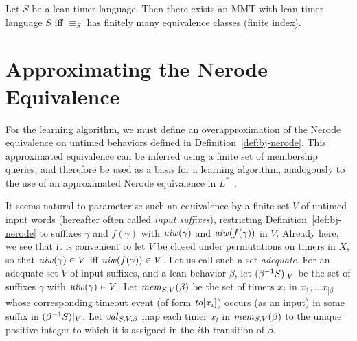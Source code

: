 \begin{theorem}
  \label{thm:bj-nerode}
Let $S$ be a lean timer language.
Then there exists an MMT with lean timer language $S$ iff 
$\equiv_S$ has finitely many equivalence classes (finite index).
\end{theorem}

\section{Approximating the Nerode Equivalence}
\label{sec:approx}

For the learning algorithm, we must define an overapproximation
of the Nerode equivalence on untimed behaviors
defined in Definition~\ref{def:bj-nerode}. This
approximated equivalence can be inferred using a finite set of membership
queries, and therefore be used as a basis for a learning algorithm,
analogously to the use of an approximated Nerode equivalence in
$L^*$~\cite{Ang87}.

It seems natural to parameterize such an equivalence by
a finite set $V$ of untimed input words (hereafter often
called {\em input suffixes}), restricting Definition~\ref{def:bj-nerode}
to suffixes $\gamma$ and $f(\gamma)$ with
$\mathit{uiw}(\gamma)$ and $\mathit{uiw}(f(\gamma))$ in $V$.
Already here, we see that it is convenient to 
let $V$ be closed under permutations
on timers in $X$, so that $\mathit{uiw}(\gamma) \in V$ iff
$\mathit{uiw}(f(\gamma)) \in V$.
Let us call such a set {\em adequate}.
For an adequate set $V$ of input suffixes, and a lean behavior $\beta$,
let $({\beta}^{-1}{S})|_{V}$ be the set of suffixes $\gamma$
with $\mathit{uiw}(\gamma) \in V$.
Let $\mathit{mem}_{S,V}(\beta)$ be the set of timers $x_i$ in
$x_1 , \ldots x_{|\beta|}$ whose corresponding timeout event
(of form $\mathit{to}[x_i]$) occurs (as an input) in some suffix in
$({\beta}^{-1}{S})|_{V}$.
Let $\mathit{val}_{S,V,\beta}$ map each timer $x_i$ in
$\mathit{mem}_{S,V}(\beta)$ to the unique positive integer to which it
is assigned in the $i$th transition of $\beta$.


